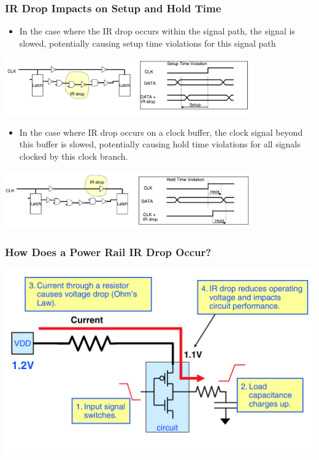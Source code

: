 \documentclass{beamer}
\begin{document}
	\begin{frame}
		\frametitle{IR Drop Impacts on Setup and Hold Time}
		\begin{itemize}
			\item In the case where the IR drop occurs within the signal path, the signal is
			slowed, potentially causing setup time violations for this signal path
		\end{itemize}
		\begin{center}
			\includegraphics[width= 0.8\textwidth]{IR2}
		\end{center}
				\begin{itemize}
			\item In the case where IR drop occurs on a clock buffer, the clock signal beyond
			this buffer is slowed, potentially causing hold time violations for all signals
			clocked by this clock branch.
		\end{itemize}
		\begin{center}
			\includegraphics[width= 0.8\textwidth]{IR3}
		\end{center}
		
	\end{frame}
	\begin{frame}
		\frametitle{How Does a Power Rail IR Drop Occur?}
	\begin{center}
		\includegraphics[width= 1\textwidth]{IR4}
	\end{center}
	\end{frame}	
\end{document}
